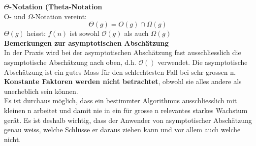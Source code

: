 \textbf{$\Theta$-Notation (Theta-Notation}\\
O- und $\Omega$-Notation vereint:
\begin{equation}
\Theta(g)= O(g) \cap \Omega(g)
\end{equation}
$\Theta(g)$ heisst: $f(n)$ ist sowohl $\mathcal{O}(g)$ als auch $\Omega(g)$\\

\textbf{Bemerkungen zur asymptotischen Abschätzung}\\
In der Praxis wird bei der asymptotischen Abschätzung fast ausschliesslich die asymptotische Abschätzung nach oben, d.h. $\mathcal{O}()$ verwendet. Die asymptotische Abschätzung ist ein gutes Mass für den schlechtesten Fall bei sehr grossen n. \textbf{Konstante Faktoren werden nicht betrachtet}, obwohl sie alles andere als unerheblich sein können.\\
Es ist durchaus möglich, dass ein bestimmter Algorithmus ausschliesslich mit kleinen n arbeitet und damit nie in ein für grosse n relevantes starkes Wachstum gerät. Es ist deshalb wichtig, dass der Anwender von asymptotischer Abschätzung genau weiss, welche Schlüsse er daraus ziehen kann und vor allem auch welche nicht.\\

